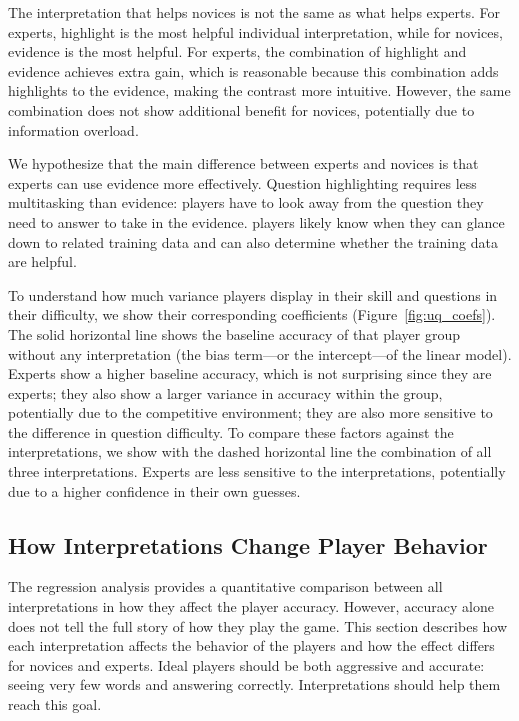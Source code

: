 The interpretation that helps novices is not the same as what helps
experts.  For experts, highlight is the most helpful individual
interpretation, while for novices, evidence is the most helpful. For
experts, the combination of highlight and evidence achieves extra
gain, which is reasonable because this combination adds
highlights to the evidence, making the contrast more intuitive.
However, the same combination does not show additional benefit for
novices, potentially due to information overload.

We hypothesize that the main difference between experts and novices is
that experts can use evidence more effectively. 
Question highlighting requires less
multitasking than evidence: players have to look away from the
question they need to answer to take in the evidence.  \qb{} players
likely know when they can glance down to related training data and can
also determine whether the training data are helpful.

To understand how much variance players display in their skill and
questions in their difficulty, we show their corresponding
coefficients (Figure~\ref{fig:uq_coefs}). The solid horizontal line
shows the baseline accuracy of that player group without any
interpretation (the bias term---or the intercept---of the linear
model). Experts show a higher baseline accuracy, which is not
surprising since they are experts; they also show a larger variance
in accuracy within the group, potentially due to the competitive
environment; they are also more sensitive to the difference in
question difficulty.
To compare these factors against the interpretations, we
show with the dashed horizontal line the combination of all three
interpretations. Experts are less sensitive to the interpretations,
potentially due to a higher confidence in their own guesses.

\subsection{How Interpretations Change Player Behavior}

The regression analysis provides a quantitative comparison between all
interpretations in how they affect the player accuracy. However,
accuracy alone does not tell the full story of how they play the
game. This section describes how each
interpretation affects the behavior of the players and how the effect
differs for novices and experts.  Ideal players should be both
aggressive and accurate: seeing very few words and answering
correctly. Interpretations should help them reach this goal.

